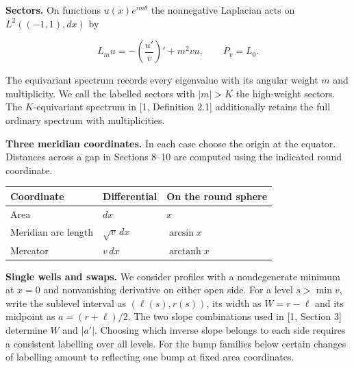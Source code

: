 \documentclass[11pt,letterpaper]{article}
\begin{document}
\textbf{Sectors.} On functions \(u(x)e^{im\theta}\) the nonnegative Laplacian acts on
\(L^2((-1,1),dx)\) by

\[L_m u=-\left(\frac{u'}{v}\right)'+m^2vu,\qquad P_v=L_0.\]

The equivariant spectrum records every eigenvalue with its angular weight \(m\) and
multiplicity. We call the labelled sectors with \(|m|>K\) the high-weight sectors. The
\(K\)-equivariant spectrum in [1, Definition 2.1] additionally retains the full ordinary
spectrum with multiplicities.

\textbf{Three meridian coordinates.} In each case choose the origin at the equator.
Distances across a gap in Sections 8--10 are computed using the indicated round coordinate.

{%
\begin{longtable}[]{@{}
  >{\raggedright\arraybackslash}p{}
  >{\raggedright\arraybackslash}p{}
  >{\raggedright\arraybackslash}p{}@{}}
\toprule\noalign{}
\begin{minipage}[b]{\linewidth}\raggedright
Coordinate
\end{minipage} & \begin{minipage}[b]{\linewidth}\raggedright
Differential
\end{minipage} & \begin{minipage}[b]{\linewidth}\raggedright
On the round sphere
\end{minipage} \\
\midrule\noalign{}
\endhead
\bottomrule\noalign{}
\endlastfoot
Area & \(dx\) & \(x\) \\
Meridian arc length & \(\sqrt v\,dx\) & \(\arcsin x\) \\
Mercator & \(v\,dx\) & \(\operatorname{arctanh}x\) \\
\end{longtable}
}

\textbf{Single wells and swaps.} We consider profiles with a nondegenerate minimum at
\(x=0\) and nonvanishing derivative on either open side. For a level \(s>\min v\), write the
sublevel interval as \((\ell(s),r(s))\), its width as \(W=r-\ell\) and its midpoint as
\(a=(r+\ell)/2\). The two slope combinations used in [1, Section 3] determine \(W\) and
\(|a'|\). Choosing which inverse slope belongs to each side requires a consistent labelling
over all levels. For the bump families below certain changes of labelling amount to
reflecting one bump at fixed area coordinates.
\end{document}
